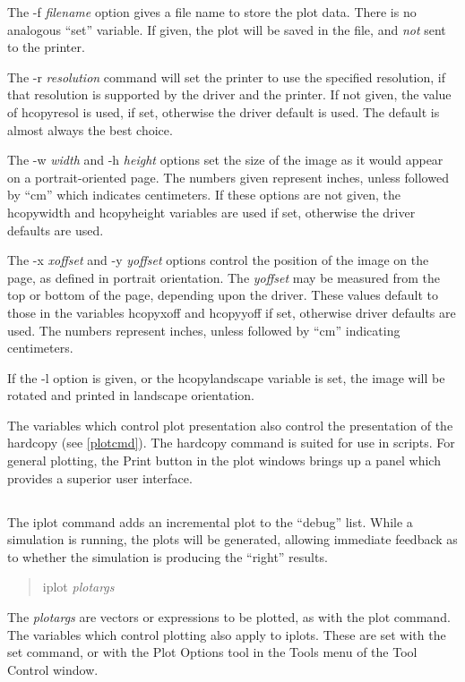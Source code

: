 The {\vt -f} {\it filename} option gives a file name to store the plot
data.  There is no analogous ``set'' variable.  If given, the plot
will be saved in the file, and {\it not} sent to the printer.

The {\vt -r} {\it resolution} command will set the printer to use the
specified resolution, if that resolution is supported by the driver
and the printer.  If not given, the value of {\et hcopyresol} is used,
if set, otherwise the driver default is used.  The default is almost
always the best choice.

The {\vt -w} {\it width} and {\vt -h} {\it height} options set the
size of the image as it would appear on a portrait-oriented page.  The
numbers given represent inches, unless followed by ``cm'' which
indicates centimeters.  If these options are not given, the {\et
hcopywidth} and {\et hcopyheight} variables are used if set, otherwise
the driver defaults are used.

The {\vt -x} {\it xoffset} and {\vt -y} {\it yoffset} options control
the position of the image on the page, as defined in portrait
orientation.  The {\it yoffset} may be measured from the top or bottom
of the page, depending upon the driver.  These values default to those
in the variables {\et hcopyxoff} and {\et hcopyyoff} if set, otherwise
driver defaults are used.  The numbers represent inches, unless
followed by ``cm'' indicating centimeters.

If the {\vt -l} option is given, or the {\et hcopylandscape} variable
is set, the image will be rotated and printed in landscape
orientation.

The variables which control plot presentation also control the
presentation of the hardcopy (see \ref{plotcmd}).  The hardcopy
command is suited for use in scripts.  For general plotting, the {\cb
Print} button in the {\cb plot} windows brings up a panel which
provides a superior user interface.
 
\subsection{}


The {\cb iplot} command adds an incremental plot to the ``debug'' list.
While a simulation is running, the plots will be generated, allowing
immediate feedback as to whether the simulation is producing the
``right'' results.
\begin{quote}\vt
iplot {\it plotargs}
\end{quote}
The {\it plotargs} are vectors or expressions to be plotted, as with
the {\cb plot} command.  The variables which control plotting also
apply to iplots.  These are set with the {\cb set} command, or with
the {\cb Plot Options} tool in the {\cb Tools} menu of the {\cb Tool
Control} window.


